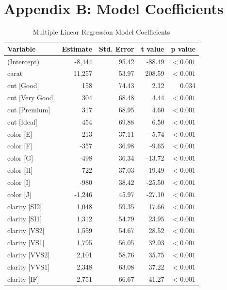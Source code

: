 \documentclass[11pt,a4paper]{article}
\begin{document}
\section{Appendix B: Model Coefficients}

\begin{table}[ht]
\centering
\caption{Multiple Linear Regression Model Coefficients}
\begin{tabular}{lrrrr}
\toprule
Variable & Estimate & Std. Error & t value & p value \\
\midrule
(Intercept) & -8,444 & 95.42 & -88.49 & $<0.001$ \\
carat & 11,257 & 53.97 & 208.59 & $<0.001$ \\
cut [Good] & 158 & 74.43 & 2.12 & 0.034 \\
cut [Very Good] & 304 & 68.48 & 4.44 & $<0.001$ \\
cut [Premium] & 317 & 68.95 & 4.60 & $<0.001$ \\
cut [Ideal] & 454 & 69.88 & 6.50 & $<0.001$ \\
color [E] & -213 & 37.11 & -5.74 & $<0.001$ \\
color [F] & -357 & 36.98 & -9.65 & $<0.001$ \\
color [G] & -498 & 36.34 & -13.72 & $<0.001$ \\
color [H] & -722 & 37.03 & -19.49 & $<0.001$ \\
color [I] & -980 & 38.42 & -25.50 & $<0.001$ \\
color [J] & -1,246 & 45.97 & -27.10 & $<0.001$ \\
clarity [SI2] & 1,048 & 59.35 & 17.66 & $<0.001$ \\
clarity [SI1] & 1,312 & 54.79 & 23.95 & $<0.001$ \\
clarity [VS2] & 1,559 & 54.67 & 28.52 & $<0.001$ \\
clarity [VS1] & 1,795 & 56.05 & 32.03 & $<0.001$ \\
clarity [VVS2] & 2,101 & 58.76 & 35.75 & $<0.001$ \\
clarity [VVS1] & 2,348 & 63.08 & 37.22 & $<0.001$ \\
clarity [IF] & 2,751 & 66.67 & 41.27 & $<0.001$ \\
\bottomrule
\end{tabular}
\end{table}
\end{document}
